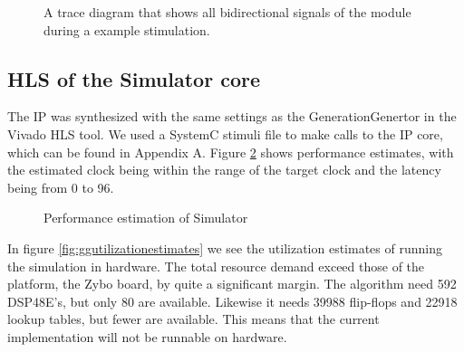 \begin{figure}[h!]
	\centering
	\caption{A trace diagram that shows all bidirectional signals of the module during a example stimulation.}
	\label{fig:generationgeneratortrace}
\end{figure}
\FloatBarrier

\subsection{HLS of the Simulator core}

The IP was synthesized with the same settings as the GenerationGenertor in the Vivado HLS tool. We used a SystemC stimuli file to make calls to the IP core, which can be found in Appendix A. Figure \ref{fig:simperformanceestimates} shows performance estimates, with the estimated clock being within the range of the target clock and the latency being from  0 to 96. 

\begin{figure}[h!]
	\centering
	\caption{Performance estimation of Simulator}
	\label{fig:simperformanceestimates}
\end{figure}
\FloatBarrier
In figure \ref{fig:ggutilizationestimates} we see the utilization estimates of running the simulation in hardware. The total resource demand exceed those of the platform, the Zybo board, by quite a significant margin. The algorithm need 592 DSP48E's, but only 80 are available. Likewise it needs 39988 flip-flops and 22918 lookup tables, but fewer are available. This means that the current implementation will not be runnable on hardware.

